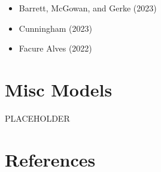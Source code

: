 \documentclass[
  letterpaper,
]{krantz}
\providecommand{\tightlist}{%
  \setlength{\itemsep}{0pt}\setlength{\parskip}{0pt}}\usepackage{longtable,booktabs,array}
\begin{document}
\begin{itemize}
\tightlist
\item
  Barrett, McGowan, and Gerke (2023)
\item
  Cunningham (2023)
\item
  Facure Alves (2022)
\end{itemize}

\chapter{Misc Models}\label{misc-models}

PLACEHOLDER

\cleardoublepage
{}
{}
\appendix

\chapter{References}\label{references}
\end{document}
